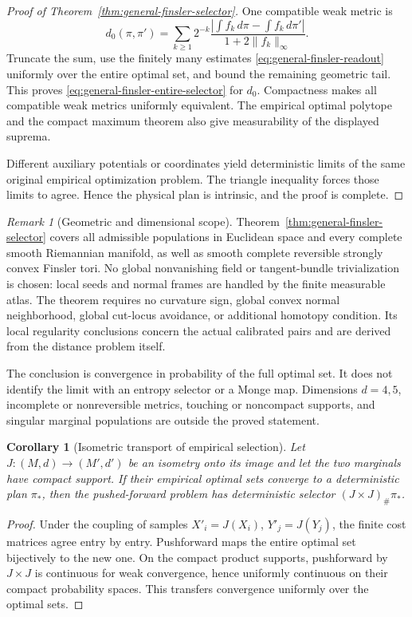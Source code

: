\documentclass[11pt,reqno]{amsart}
\newtheorem{corollary}[theorem]{Corollary}
\theoremstyle{definition}
\theoremstyle{remark}
\newtheorem{remark}[theorem]{Remark}
\numberwithin{equation}{section}
\begin{document}
\begin{proof}[Proof of Theorem~\ref{thm:general-finsler-selector}]
One compatible weak metric is
\[
 d_0(\pi,\pi')=\sum_{k\ge1}2^{-k}
 \frac{\left|\int f_k\,d\pi-\int f_k\,d\pi'\right|}
      {1+2\|f_k\|_\infty}.
\]
Truncate the sum, use the finitely many estimates
\eqref{eq:general-finsler-readout} uniformly over the entire optimal
set, and bound the remaining geometric tail. This proves
\eqref{eq:general-finsler-entire-selector} for \(d_0\).
Compactness makes all compatible weak metrics uniformly equivalent.
The empirical optimal polytope and the compact maximum theorem
also give measurability of the displayed suprema.

Different auxiliary potentials or coordinates yield deterministic
limits of the same original empirical optimization problem.
The triangle inequality forces those limits to agree. Hence the
physical plan is intrinsic, and the proof is complete.
\end{proof}

\begin{remark}[Geometric and dimensional scope]
\label{rem:general-finsler-scope}
Theorem~\ref{thm:general-finsler-selector} covers all admissible
populations in Euclidean space and every complete smooth Riemannian
manifold, as well as smooth complete reversible strongly convex
Finsler tori. No global nonvanishing field or tangent-bundle
trivialization is chosen: local seeds and normal frames are handled
by the finite measurable atlas. The theorem requires no curvature
sign, global convex normal neighborhood, global cut-locus avoidance,
or additional homotopy condition. Its local regularity conclusions
concern the actual calibrated pairs and are derived from the
distance problem itself.

The conclusion is convergence in probability of the full optimal
set. It does not identify the limit with an entropy selector or a
Monge map. Dimensions \(d=4,5\), incomplete or nonreversible
metrics, touching or noncompact supports, and singular marginal
populations are outside the proved statement.
\end{remark}

\begin{corollary}[Isometric transport of empirical selection]
\label{cor:isometry}
Let \(J:(M,d)\to(M',d')\) be an isometry onto its image and let the
two marginals have compact support. If their empirical optimal sets
converge to a deterministic plan \(\pi_*\), then the pushed-forward
problem has deterministic selector \((J\times J)_\#\pi_*\).
\end{corollary}

\begin{proof}
Under the coupling of samples \(X'_i=J(X_i)\), \(Y'_j=J(Y_j)\),
the finite cost matrices agree entry by entry. Pushforward maps the
entire optimal set bijectively to the new one. On the compact product
supports, pushforward by \(J\times J\) is continuous for weak
convergence, hence uniformly continuous on their compact probability
spaces. This transfers convergence uniformly over the optimal sets.
\end{proof}
\end{document}
